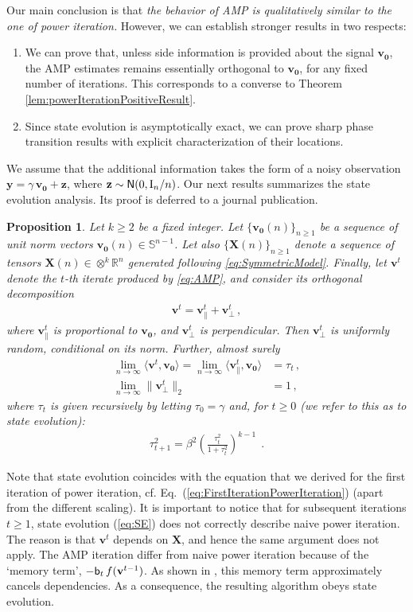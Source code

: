 \documentclass[11pt]{article}
\newtheorem{proposition}[claim]{Proposition}
\theoremstyle{definition}
\def\<{\langle}
\def\>{\rangle}
\def\reals{\mathbb{R}}
\def\bv{\mathbf{v}}
\def\bz{\mathbf{z}}
\def\bvz{\mathbf{v_0}}
\def\bX{\mathbf{X}}
\def\bbS{\mathbb{S}}
\def\normal{{\sf N}}
\def\id{{\rm I}}
\def\ons{{\sf b}}
\def\by{{\mathbf y}}
\begin{document}
Our main conclusion is that \emph{the behavior of AMP is qualitatively
similar to the one of power iteration.}  However, we can establish 
stronger results in two respects:
%
\begin{enumerate}
%
\item We can prove that, unless side information
is provided about the signal $\bvz$, the AMP estimates remains
essentially orthogonal to $\bvz$, for any fixed number of iterations. 
This corresponds to a converse to Theorem \ref{lem:powerIterationPositiveResult}.
%
\item Since state evolution is asymptotically exact, we can prove
sharp phase transition results with explicit characterization of their locations.
%
\end{enumerate}


We assume that the additional information takes the form of a noisy
observation 
$\by = \gamma\, \bvz + \bz$, where $\bz\sim\normal(0,\id_n/n)$.
Our next results summarizes the state evolution analysis. Its proof is
deferred to a journal publication.
%
\begin{proposition} \label{propo:AMP_STATE}
%
Let $k \geq 2$ be a fixed integer. Let $\{
  \bvz(n)\}_{n\geq 1}$ be a sequence of unit norm vectors
  $\bvz(n)\in\bbS^{n-1}$. Let also $\{ \bX(n)\}_{n\geq 1}$ denote a sequence of tensors
  $\bX(n) \in \otimes^k \reals^n$ generated following
  \ref{eq:SymmetricModel}. Finally, let $\bv^t$ denote the $t$-th
  iterate produced by  \ref{eq:AMP}, and consider its orthogonal decomposition
%
\begin{align}
%
\bv^t = \bv^t_{\parallel} + \bv^t_{\perp}\, ,
%
\end{align}
%
where $\bv^t_{\parallel}$ is proportional to $\bvz$, and
$\bv^t_{\perp}$ is perpendicular.  Then $\bv^t_{\perp}$ is uniformly random, conditional on its norm.
Further, almost surely 
%
\begin{align}
%
\lim_{n \to \infty} \<\bv^t,\bvz\> =\lim_{n \to \infty} \<\bv^t_{\parallel},\bvz\> & = \tau_t \, ,\\
\lim_{n \to \infty} \|\bv^t_{\perp}\|_2 &= 1 \, ,
%
\end{align}
%
where $\tau_t$ is given recursively by letting $\tau_0=\gamma$ and, for
$t\ge 0$ (we refer to this as to \emph{state evolution}):
%
\begin{align}\label{eq:SE}
%
  \tau_{t+1}^2 = \beta^2 \left (\frac{\tau_t^2}{1+\tau_t^2}\right )^{k-1}~~.
%
\end{align}
\end{proposition}
%
Note that state evolution coincides with the equation that we derived
for the first iteration of power iteration, cf.
Eq.~(\ref{eq:FirstIterationPowerIteration}) (apart from the different scaling). It is important to notice
that for subsequent iterations $t\ge 1$, state evolution (\ref{eq:SE})
does not correctly describe naive power iteration. The reason is that
$\bv^t$ depends on $\bX$, and hence the same argument does not apply.
The AMP iteration differ  from naive power iteration because of the `memory
term', $-\ons_t\,f(\bv^{t-1})$. As shown in \cite{BM-MPCS-2011}, this
memory term approximately cancels dependencies. As a consequence, the
resulting algorithm obeys state evolution.
\end{document}
